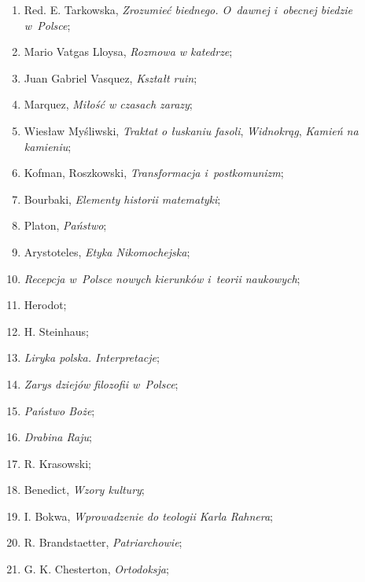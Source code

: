 \documentclass[a4paper,11pt]{article}
\begin{document}
\begin{enumerate}
\item Red. E. Tarkowska, \emph{Zrozumieć biednego. O~dawnej i~obecnej
    biedzie w~Polsce};

\item Mario Vatgas Lloysa, \emph{Rozmowa w katedrze};

\item Juan Gabriel Vasquez, \emph{Kształt ruin};

\item Marquez, \emph{Miłość w czasach zarazy};

\item Wiesław Myśliwski, \emph{Traktat o łuskaniu fasoli},
  \emph{Widnokrąg}, \emph{Kamień na kamieniu};

\item Kofman, Roszkowski, \emph{Transformacja i~postkomunizm};

\item Bourbaki, \emph{Elementy historii matematyki};

\item Platon, \emph{Państwo};

\item Arystoteles, \emph{Etyka Nikomochejska};

\item \emph{Recepcja w~Polsce nowych kierunków i~teorii naukowych};

\item Herodot;

\item H. Steinhaus;

\item \emph{Liryka polska. Interpretacje};

\item \emph{Zarys dziejów filozofii w~Polsce};

\item \emph{Państwo Boże};

\item \emph{Drabina Raju};

\item R. Krasowski;

\item Benedict, \emph{Wzory kultury};

\item I. Bokwa, \emph{Wprowadzenie do teologii Karla Rahnera};

\item R. Brandstaetter, \emph{Patriarchowie};

\item G. K. Chesterton, \emph{Ortodoksja};


\end{enumerate}
\end{document}
